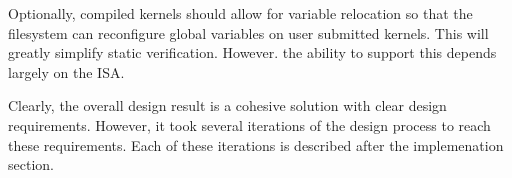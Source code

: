 Optionally, compiled kernels should allow for variable relocation so that the
filesystem can reconfigure global variables on user submitted kernels. This
will greatly simplify static verification. However. the ability to support this
depends largely on the ISA.

Clearly, the overall design result is a cohesive solution with clear design
requirements. However, it took several iterations of the design process to
reach these requirements. Each of these iterations is described after the
implemenation section.

